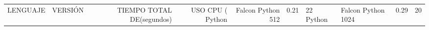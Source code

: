 \begin{tabular}{llrrr}
\toprule
LENGUAJE &            VERSIÓN & TIEMPO TOTAL DE (segundos) & USO CPU (%
\midrule
  Python &  Falcon Python 512 &                                  0.21 &         22%
  Python & Falcon Python 1024 &                                  0.29 &         20%
\bottomrule
\end{tabular}

